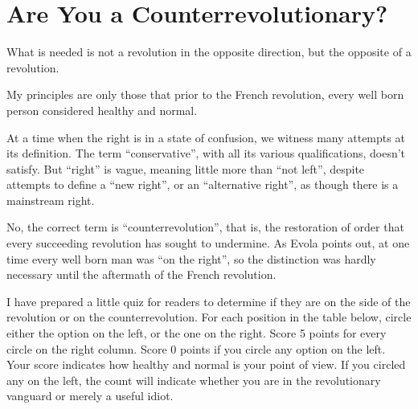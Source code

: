 \section{Are You a Counterrevolutionary?}

\label{sec:Counterrevolutionary}

\begin{quotex}
What is needed is not a revolution in the opposite direction, but the opposite of a revolution.
\end{quotex}


\begin{quotex}
My principles are only those that prior to the French revolution, every well born person considered healthy and normal.
\end{quotex}


At a time when the right is in a state of confusion, we witness many attempts at its definition. The term ``conservative'', with all its various qualifications, doesn't satisfy. But ``right'' is vague, meaning little more than ``not left'', despite attempts to define a ``new right'', or an ``alternative right'', as though there is a mainstream right.

No, the correct term is ``counterrevolution'', that is, the restoration of order that every succeeding revolution has sought to undermine. As Evola points out, at one time every well born man was ``on the right'', so the distinction was hardly necessary until the aftermath of the French revolution.

I have prepared a little quiz for readers to determine if they are on the side of the revolution or on the counterrevolution. For each position in the table below, circle either the option on the left, or the one on the right. Score 5 points for every circle on the right column. Score 0 points if you circle any option on the left. Your score indicates how healthy and normal is your point of view. If you circled any on the left, the count will indicate whether you are in the revolutionary vanguard or merely a useful idiot.

